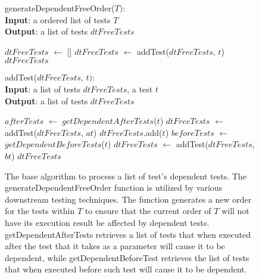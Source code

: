 \begin{figure}[t]
	generateDependentFreeOrder($\mathit{T}):$\\
	\textbf{Input}: a ordered list of tests $\mathit{T}$\\
	\textbf{Output}: a list of tests $\mathit{dtFreeTests}$\\
	\vspace{-5mm}
	\begin{algorithmic}[1]
		\STATE $\mathit{dtFreeTests}$ $\leftarrow$ []
			\STATE $\mathit{dtFreeTests}$ $\leftarrow$
			addTest($\mathit{dtFreeTests}$, $\mathit{t}$)	
		\ENDFOR
		\RETURN $\mathit{dtFreeTests}$
	\end{algorithmic}

	addTest($\mathit{dtFreeTests}$, $\mathit{t}):$\\
	\textbf{Input}: a list of tests $\mathit{dtFreeTests}$,
	a test $\mathit{t}$\\
	\textbf{Output}: a list of tests $\mathit{dtFreeTests}$\\
	\vspace{-5mm}
	\begin{algorithmic}[1]
			\STATE $\mathit{afterTests}$ $\leftarrow$
			$\mathit{getDependentAfterTests}$($\mathit{t}$)
				\STATE $\mathit{dtFreeTests}$ $\leftarrow$
				addTest($\mathit{dtFreeTests}$, $\mathit{at}$)
			\ENDFOR
			\STATE $\mathit{dtFreeTests}$.add($\mathit{t}$)
			\STATE $\mathit{beforeTests}$ $\leftarrow$
			$\mathit{getDependentBeforeTests}$($\mathit{t}$)
				\STATE $\mathit{dtFreeTests}$ $\leftarrow$
				addTest($\mathit{dtFreeTests}$, $\mathit{bt}$)
			\ENDFOR
		\ENDIF
		\RETURN $\mathit{dtFreeTests}$
	\end{algorithmic}
	\vspace{-3mm}
	\caption {
		The base algorithm to process a list of test's dependent tests. The
		generateDependentFreeOrder function is utilized by various downstream
		testing techniques. The function generates a new order for the tests
		within $\mathit{T}$ to ensure that the current order of $\mathit{T}$
		will not have its execution result be affected by dependent tests. 
		getDependentAfterTests retrieves a list of tests that when executed after
		the test that it takes as a parameter will cause it to be dependent, while
		getDependentBeforeTest retrieves the list of tests that when executed
		before such test will cause it to be dependent.
	}
	\label{fig:processDT}
\end{figure}

